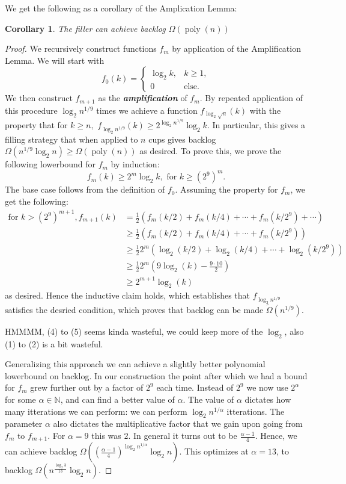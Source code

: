 \documentclass{article}[11pt]
\newcommand{\defn}[1]{{\textit{\textbf{\boldmath #1}}}}
\DeclareMathOperator{\poly}{\text{poly}}
\newtheorem{corollary}{Corollary}
\begin{document}
We get the following as a corollary of the Amplication Lemma:
\begin{corollary}
  The filler can achieve backlog $\Omega(\poly(n))$
\end{corollary}
\begin{proof}
  We recursively construct functions $f_m$ by application of the Amplification
  Lemma. We will start with 
  $$f_0(k) = 
  \begin{cases} 
    \log_2 k, & k\geq 1, \\
    0 & \text{else.}
  \end{cases}$$
    We then construct $f_{m+1}$ as the
  \defn{amplification} of $f_m$.  
  By repeated application of this procedure $\log_2 n^{1/9}$ times we 
  achieve a function $f_{\log_2 \sqrt{n}}(k)$ with the property that for $k \geq n,$
  $f_{\log_2 n^{1/9}}(k) \geq 2^{\log_2 n^{1/9}} \log_2 k$. In particular, this gives a filling strategy 
  that when applied to $n$ cups gives backlog $\Omega(n^{1/9}\log_2 n) \ge \Omega(\poly(n))$ as desired.
  To prove this, we prove the following lowerbound for $f_m$ by induction:
  $$f_m(k) \geq 2^m \log_2 k, \text{ for } k \geq (2^9)^m.$$
  The base case follows from the definition of $f_0$. Assuming the property for $f_m$, we get the following:
  \begin{align}
    \text{for } k > (2^9)^{m+1}, f_{m+1}(k) &= \frac{1}{2}(f_m(k/2) + f_m(k/4) + \cdots + f_m(k/2^9) + \cdots)\\
  &\geq \frac{1}{2}(f_m(k/2) + f_m(k/4) + \cdots + f_m(k/2^9))\\
  &\geq \frac{1}{2}2^m(\log_2 (k/2) + \log_2(k/4) + \cdots + \log_2(k/2^9))\\
  &\geq \frac{1}{2}2^m(9\log_2 (k) - \frac{9 \cdot 10}{2})\\
  &\geq 2^{m+1} \log_2(k) 
  \end{align}
  as desired. Hence the inductive claim holds, which establishes that $f_{\log_2
  n^{1/9}}$ satisfies the desried condition, which proves that backlog can be
  made $\tilde{\Omega}(n^{1/9})$.

  {\color{red} HMMMM, (4) to (5) seems kinda wasteful, we could keep more of
  the $\log_2$, also (1) to (2) is a bit wasteful.}

  Generalizing this approach we can achieve a slightly better polynomial
  lowerbound on backlog.  In our construction the point after which we had a
  bound for $f_m$ grew further out by a factor of $2^9$ each time. Instead of
  $2^9$ we now use $2^\alpha$ for some $\alpha \in \mathbb{N}$, and can find a
  better value of $\alpha$.  The value of $\alpha$ dictates how many
  itterations we can perform: we can perform $\log_2 n^{1/\alpha}$ itterations.
  The parameter $\alpha$ also dictates the multiplicative factor that we gain
  upon going from $f_m$ to $f_{m+1}$. For $\alpha = 9$ this was $2$. In general
  it turns out to be $\frac{\alpha -1}{4}$.  Hence, we can achieve backlog
  $\Omega\left(\left(\frac{\alpha -1}{4}\right)^{\log_2 n^{1/\alpha}}\log_2
  n\right)$. This optimizes at $\alpha = 13$, to backlog $\Omega(n^{\frac{\log_2 3}{13}}\log_2 n)$. 


\end{proof}
\end{document}
